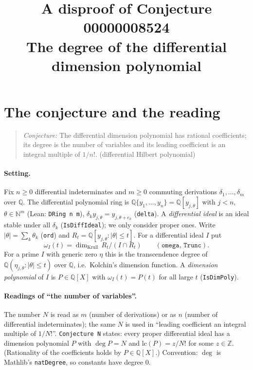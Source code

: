 \documentclass[11pt]{article}
\title{A disproof of Conjecture 00000008524\\[2pt]
\large The degree of the differential dimension polynomial}
\date{}
\renewcommand{\_}{\oldus\allowbreak}
\theoremstyle{definition}
\newcommand{\Q}{\mathbb{Q}}
\begin{document}
\sloppy
\maketitle

\section{The conjecture and the reading}

\begin{quote}
\emph{Conjecture:} The differential dimension polynomial has rational coefficients; its degree is the number of
variables and its leading coefficient is an integral multiple of $1/n!$. (differential Hilbert polynomial)
\end{quote}

\paragraph{Setting.} Fix $n\ge 0$ differential indeterminates and $m\ge 0$ commuting derivations
$\delta_1,\dots,\delta_m$ over $\Q$. The differential polynomial ring is $\Q\{y_1,\dots,y_n\}=\Q[y_{j,\theta}]$
with $j<n$, $\theta\in\mathbb{N}^m$ (Lean: \texttt{DRing n m}), $\delta_k y_{j,\theta}=y_{j,\theta+e_k}$
(\texttt{delta}). A \emph{differential ideal} is an ideal stable under all $\delta_k$ (\texttt{IsDiffIdeal}); we
only consider proper ones. Write $|\theta|=\sum_k\theta_k$ (\texttt{ord}) and
$R_t=\Q[y_{j,\theta}:|\theta|\le t]$. For a differential ideal $I$ put
\[
\omega_I(t)=\dim_{\mathrm{Krull}}\, R_t/(I\cap R_t)\qquad(\texttt{omega, Trunc}).
\]
For a prime $I$ with generic zero $\eta$ this is the transcendence degree of $\Q(\eta_{j,\theta}:|\theta|\le t)$
over $\Q$, i.e.\ Kolchin's dimension function. A \emph{dimension polynomial} of $I$ is $P\in\Q[X]$ with
$\omega_I(t)=P(t)$ for all large $t$ (\texttt{IsDimPoly}).

\paragraph{Readings of ``the number of variables''.} The number $N$ is read as $m$ (number of derivations) or as
$n$ (number of differential indeterminates); the same $N$ is used in ``leading coefficient an integral
multiple of $1/N!$''. \texttt{Conjecture N} states: every proper differential ideal has a dimension polynomial
$P$ with $\deg P=N$ and $\mathrm{lc}(P)=z/N!$ for some $z\in\mathbb{Z}$. (Rationality of the coefficients holds
by $P\in\Q[X]$.) Convention: $\deg$ is Mathlib's \texttt{natDegree}, so constants have degree $0$.
\end{document}
